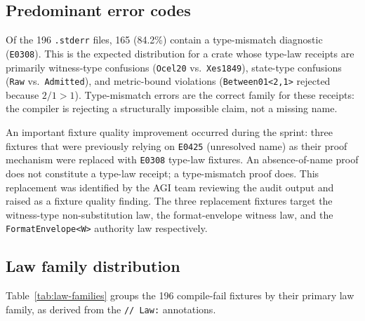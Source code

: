 \subsection{Predominant error codes}
\label{ssec:crown-error-codes}

Of the 196 \texttt{.stderr} files, 165 (84.2\%) contain a type-mismatch
diagnostic (\texttt{E0308}). This is the expected distribution for a crate whose
type-law receipts are primarily witness-type confusions (\texttt{Ocel20} vs.\
\texttt{Xes1849}), state-type confusions (\texttt{Raw} vs.\ \texttt{Admitted}),
and metric-bound violations (\texttt{Between01<2,1>} rejected because
$2/1 > 1$). Type-mismatch errors are the correct family for these receipts: the
compiler is rejecting a structurally impossible claim, not a missing name.

An important fixture quality improvement occurred during the sprint: three
fixtures that were previously relying on \texttt{E0425} (unresolved name) as
their proof mechanism were replaced with \texttt{E0308} type-law fixtures. An
absence-of-name proof does not constitute a type-law receipt; a type-mismatch
proof does. This replacement was identified by the AGI team reviewing the audit
output and raised as a fixture quality finding. The three replacement fixtures
target the witness-type non-substitution law, the format-envelope witness law,
and the \texttt{FormatEnvelope<W>} authority law respectively.

\subsection{Law family distribution}
\label{ssec:crown-law-families}

Table~\ref{tab:law-families} groups the 196 compile-fail fixtures by their
primary law family, as derived from the \texttt{// Law:} annotations.

